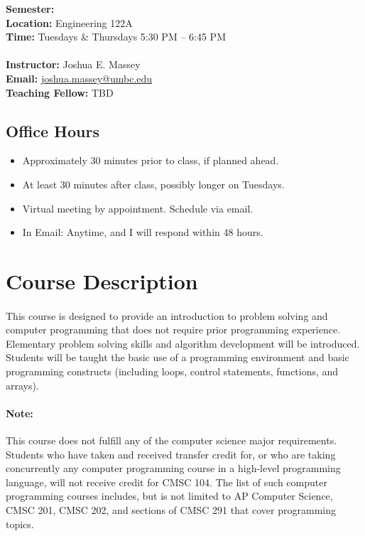 \documentclass[letter,10pt]{article}
\begin{document}
\textbf{Semester:} \\
\textbf{Location:} Engineering 122A \\
\textbf{Time:} Tuesdays \& Thursdays 5:30 PM -- 6:45 PM \\\\
\textbf{Instructor:} Joshua E. Massey \\
\textbf{Email:} \href{mailto:joshua.massey@umbc.edu?Subject=[CMSC 104]}{joshua.massey@umbc.edu} \\
\textbf{Teaching Fellow:} TBD \\

\subsection*{Office Hours}
\begin{itemize}
\item Approximately 30 minutes prior to class, if planned ahead.
\item At least 30 minutes after class, possibly longer on Tuesdays.
\item Virtual meeting by appointment. Schedule via email.
\item In Email: Anytime, and I will respond within 48 hours.
\end{itemize}

\section*{Course Description}
\paragraph{}This course is designed to provide an introduction to problem solving and computer programming that does not require prior programming experience. Elementary problem solving skills and algorithm development will be introduced. Students will be taught the basic use of a programming environment and basic programming constructs (including loops, control statements, functions, and arrays).

\paragraph{Note:}This course does not fulfill any of the computer science major requirements. Students who have taken and received transfer credit for, or who are taking concurrently any computer programming course in a high-level programming language, will not receive credit for CMSC 104. The list of such computer programming courses includes, but is not limited to AP Computer Science, CMSC 201, CMSC 202, and sections of CMSC 291 that cover programming topics.
\end{document}
